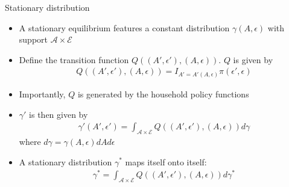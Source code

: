 \documentclass[9pt]{beamer}
\newcommand{\bit}{\begin{itemize}}
\newcommand{\eit}{\end{itemize}}
\newcommand{\bc}{\color{blue}}
\begin{document}
\begin{frame}{Stationary distribution}

\bit
\setlength\itemsep{1.5em}

\item A stationary equilibrium features a constant distribution $\gamma(A, \epsilon)$ with support $\bm{\mathcal A} \times \bm{\mathcal E}$

\item Define the transition function $Q((A',\epsilon'), (A, \epsilon))$. $Q$ is given by
\begin{eqnarray}
Q((A',\epsilon'), (A, \epsilon)) =  I_{A'=A'(A,\epsilon)} \pi(\epsilon', \epsilon) \nonumber
\end{eqnarray}

\item Importantly, {\bc $Q$ is generated by the household policy functions}

\item $\gamma'$ is then given by
\begin{eqnarray}
\gamma'(A', \epsilon') = \int_{\bm{\mathcal A} \times \bm{\mathcal E}} Q((A',\epsilon'), (A, \epsilon)) d\gamma \nonumber
\end{eqnarray}
where {\bc $d\gamma = \gamma(A, \epsilon) dA d\epsilon$}

\item A stationary distribution $\gamma^*$ maps itself onto itself:
\begin{eqnarray}
\gamma^* = \int_{\bm{\mathcal A} \times \bm{\mathcal E}} Q((A',\epsilon'), (A, \epsilon)) d\gamma^* \nonumber
\end{eqnarray}

\eit

\end{frame}
\end{document}
